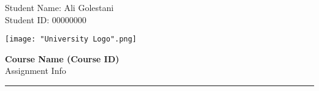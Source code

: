 \documentclass[11pt,letterpaper]{article}
\begin{document}
\pagestyle{plain}

\begin{flushleft}
Student Name: Ali Golestani\\
Student ID: 00000000
\end{flushleft}

\begin{flushright}\vspace{-15mm}
\texttt{[image: "University Logo".png]}
\end{flushright}
 
\begin{center}\vspace{-1cm}
\textbf{\large Course Name (Course ID)}\\
Assignment Info
\end{center}

\rule{\linewidth}{0.1mm}
\end{document}
